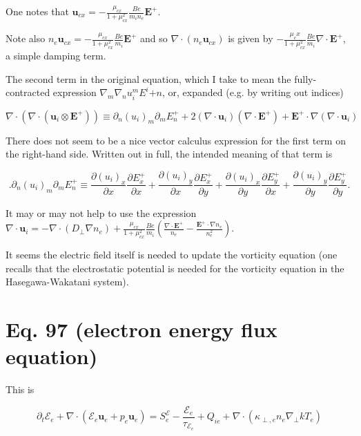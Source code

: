 \documentclass[11pt]{article}
\newcommand{\mbf}{\mathbf}
\begin{document}
One notes that $\mbf{u}_{cx} = -\frac{\mu_{cx}}{1+\mu_{cx}^2} \frac{B e}{m_i n_e} \mbf{E}^+$.

Note also $n_e \mbf{u}_{cx} = - \frac{\mu_{cx}}{1+\mu_{cx}^2} \frac{Be}{m_i} \mbf{E}^+$ and so $\nabla \cdot (n_e \mbf{u}_{cx})$ is given by $- \frac{\mu_cx}{1+\mu_{cx}^2} \frac{Be}{m_i} \nabla \cdot \mbf{E}^+$, a simple damping term.

The second term in the original equation, which I take to mean the fully-contracted expression $\nabla_m \nabla_n u_i^m E^i{+n}$, or, expanded (e.g. by writing out indices)

\begin{equation}
\nabla \cdot ( \nabla \cdot ( \mbf{u}_i \otimes \mbf{E}^+ )) \equiv \partial_n (u_i)_m \partial_m E^+_n + 2 (\nabla \cdot \mbf{u}_i) (\nabla \cdot \mbf{E}^+) + \mbf{E}^+ \cdot \nabla (\nabla \cdot \mbf{u}_i)
\end{equation}

There does not seem to be a nice vector calculus expression for the first term on the right-hand side.  Written out in full, the intended meaning of that term is

\begin{equation}
.\partial_n (u_i)_m \partial_m E^+_n \equiv \frac{\partial (u_i)_x}{\partial x} \frac{\partial E^+_x}{\partial x}+ \frac{\partial (u_i)_y}{\partial x} \frac{\partial E^+_x}{\partial y} + \frac{\partial (u_i)_x}{\partial y} \frac{\partial E^+_y}{\partial x}+\frac{\partial (u_i)_y}{\partial y} \frac{\partial E^+_y}{\partial y}.
\end{equation}

It may or may not help to use the expression $\nabla \cdot \mbf{u}_i = - \nabla \cdot (D_{\perp} \nabla n_e) + \frac{\mu_{cx}}{1+\mu_{cx}^2} \frac{Be}{m_i} \left ( \frac{\nabla \cdot \mbf{E}^+}{n_e} - \frac{\mbf{E}^+ \cdot \nabla n_e}{n_e^2} \right )$.

It seems the electric field itself is needed to update the vorticity equation (one recalls that the electrostatic potential is needed for the vorticity equation in the Hasegawa-Wakatani system).

\section{Eq. 97 (electron energy flux equation)}

This is 

\begin{equation}
\partial_t \mathcal{E}_e+\nabla \cdot (\mathcal{E}_e \mbf{u}_e+ p_e \mbf{u}_e) = S_e^{\mathcal{E}}-\frac{\mathcal{E}_e}{\tau_{\mathcal{E}_e}}+Q_{ie}+\nabla \cdot(\kappa_{\perp,e} n_e \nabla_{\perp} k T_e)
\end{equation}
\end{document}
